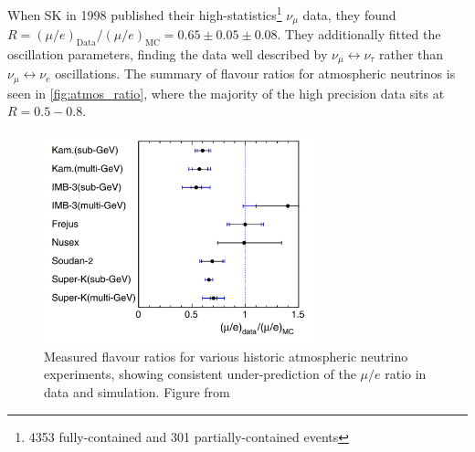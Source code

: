 When SK in 1998 published\cite{sk_disc} their high-statistics\footnote{4353 fully-contained and 301 partially-contained events} $\nu_\mu$ data, they found $R=\left( \mu/e \right)_\text{Data}/\left( \mu/e \right)_\text{MC} =0.65\pm0.05\pm0.08$. They additionally fitted the oscillation parameters, finding the data well described by $\nu_\mu \leftrightarrow \nu_\tau$ rather than $\nu_\mu \leftrightarrow \nu_e$ oscillations. The summary of flavour ratios for atmospheric neutrinos is seen in \autoref{fig:atmos_ratio}, where the majority of the high precision data sits at $R=0.5-0.8$.
\begin{figure}[h]
	\includegraphics[width=0.7\textwidth, trim={0mm 0mm 0mm 0mm}, clip,page=1]{figures/theory/flavour_ratio}
	\caption{Measured flavour ratios for various historic atmospheric neutrino experiments, showing consistent under-prediction of the $\mu/e$ ratio in data and simulation. Figure from \cite{kajita_summary}}
	\label{fig:atmos_ratio}
\end{figure}

